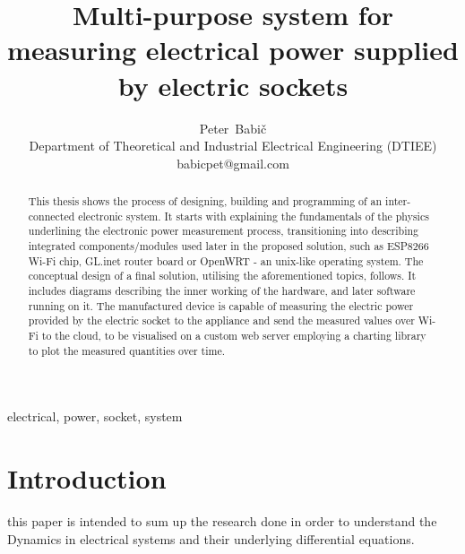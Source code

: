 \documentclass[journal]{IEEEtran}
\begin{document}
\boldmath

\title{Multi-purpose system for measuring electrical power supplied by electric sockets}

\author{Peter~Babič\\%
        Department of Theoretical and Industrial Electrical Engineering (DTIEE)\\%
        babicpet@gmail.com%
}

%
{}


\maketitle


\begin{abstract}
This thesis shows the process of designing, building and programming of an inter-connected electronic system. It starts with explaining the fundamentals of the physics underlining the electronic power measurement process, transitioning into describing integrated components/modules used later in the proposed solution, such as ESP8266 Wi-Fi chip, GL.inet router board or OpenWRT - an unix-like operating system. The conceptual design of a final solution, utilising the aforementioned topics, follows. It includes diagrams describing the inner working of the hardware, and later software running on it. The manufactured device is capable of measuring the electric power provided by the electric socket to the appliance and send the measured values over Wi-Fi to the cloud, to be visualised on a custom web server employing a charting library to plot the measured quantities over time.
\end{abstract}

\begin{IEEEkeywords}
electrical, power, socket, system
\end{IEEEkeywords}



\IEEEpeerreviewmaketitle



\section{Introduction}

 this paper is intended to sum up the research done in order to understand the Dynamics in electrical systems and their underlying differential equations.
\end{document}
